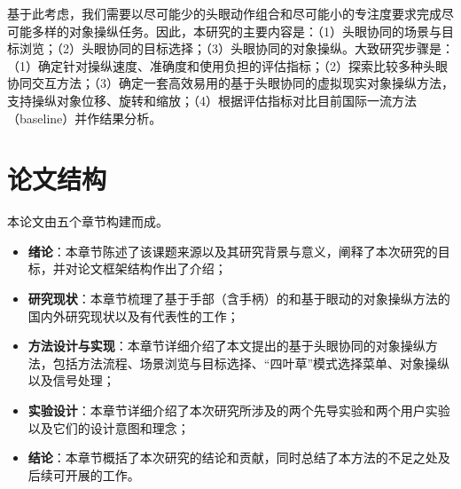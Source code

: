 基于此考虑，我们需要以尽可能少的头眼动作组合和尽可能小的专注度要求完成尽可能多样的对象操纵任务。因此，本研究的主要内容是：（1）头眼协同的场景与目标浏览；（2）头眼协同的目标选择；（3）头眼协同的对象操纵。大致研究步骤是：（1）确定针对操纵速度、准确度和使用负担的评估指标；（2）探索比较多种头眼协同交互方法；（3）确定一套高效易用的基于头眼协同的虚拟现实对象操纵方法，支持操纵对象位移、旋转和缩放；（4）根据评估指标对比目前国际一流方法（baseline）并作结果分析。

\section{论文结构}

本论文由五个章节构建而成。

\begin{itemize}
	\item {\bf 绪论}：本章节陈述了该课题来源以及其研究背景与意义，阐释了本次研究的目标，并对论文框架结构作出了介绍；
	\item {\bf 研究现状}：本章节梳理了基于手部（含手柄）的和基于眼动的对象操纵方法的国内外研究现状以及有代表性的工作；
	\item {\bf 方法设计与实现}：本章节详细介绍了本文提出的基于头眼协同的对象操纵方法，包括方法流程、场景浏览与目标选择、“四叶草”模式选择菜单、对象操纵以及信号处理；
	\item {\bf 实验设计}：本章节详细介绍了本次研究所涉及的两个先导实验和两个用户实验以及它们的设计意图和理念；
	\item {\bf 结论}：本章节概括了本次研究的结论和贡献，同时总结了本方法的不足之处及后续可开展的工作。
\end{itemize}